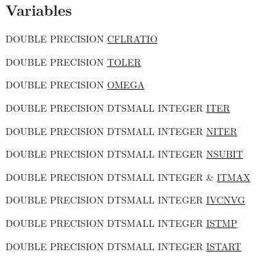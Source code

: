 \subsection*{Variables}
\begin{DoxyCompactItemize}
\item 
D\-O\-U\-B\-L\-E P\-R\-E\-C\-I\-S\-I\-O\-N \hyperlink{msa20_2home_2abonfi_2_c_f_d__codes_2_eul_f_s_83_82_83_2include_2conv_8com_afddb47408d5e35303a408fd28821caa1}{C\-F\-L\-R\-A\-T\-I\-O}
\item 
D\-O\-U\-B\-L\-E P\-R\-E\-C\-I\-S\-I\-O\-N \hyperlink{msa20_2home_2abonfi_2_c_f_d__codes_2_eul_f_s_83_82_83_2include_2conv_8com_a695d875d45bd834620ef52158325ca2a}{T\-O\-L\-E\-R}
\item 
D\-O\-U\-B\-L\-E P\-R\-E\-C\-I\-S\-I\-O\-N \hyperlink{msa20_2home_2abonfi_2_c_f_d__codes_2_eul_f_s_83_82_83_2include_2conv_8com_a27b76f3b783d9cc5fffe85f1e22ecb89}{O\-M\-E\-G\-A}
\item 
D\-O\-U\-B\-L\-E P\-R\-E\-C\-I\-S\-I\-O\-N D\-T\-S\-M\-A\-L\-L I\-N\-T\-E\-G\-E\-R \hyperlink{msa20_2home_2abonfi_2_c_f_d__codes_2_eul_f_s_83_82_83_2include_2conv_8com_a5e8268d7a99a27a3889882b8cb685176}{I\-T\-E\-R}
\item 
D\-O\-U\-B\-L\-E P\-R\-E\-C\-I\-S\-I\-O\-N D\-T\-S\-M\-A\-L\-L I\-N\-T\-E\-G\-E\-R \hyperlink{msa20_2home_2abonfi_2_c_f_d__codes_2_eul_f_s_83_82_83_2include_2conv_8com_a0a434a625bddcbee262d330f471d5b54}{N\-I\-T\-E\-R}
\item 
D\-O\-U\-B\-L\-E P\-R\-E\-C\-I\-S\-I\-O\-N D\-T\-S\-M\-A\-L\-L I\-N\-T\-E\-G\-E\-R \hyperlink{msa20_2home_2abonfi_2_c_f_d__codes_2_eul_f_s_83_82_83_2include_2conv_8com_aceeea16657a8729e23a6145062b0af71}{N\-S\-U\-B\-I\-T}
\item 
D\-O\-U\-B\-L\-E P\-R\-E\-C\-I\-S\-I\-O\-N D\-T\-S\-M\-A\-L\-L I\-N\-T\-E\-G\-E\-R \& \hyperlink{msa20_2home_2abonfi_2_c_f_d__codes_2_eul_f_s_83_82_83_2include_2conv_8com_aed14565252ecc7b0d32f2e1eece0e781}{I\-T\-M\-A\-X}
\item 
D\-O\-U\-B\-L\-E P\-R\-E\-C\-I\-S\-I\-O\-N D\-T\-S\-M\-A\-L\-L I\-N\-T\-E\-G\-E\-R \hyperlink{msa20_2home_2abonfi_2_c_f_d__codes_2_eul_f_s_83_82_83_2include_2conv_8com_acef83c369dada2c28e14e0bbf42054cf}{I\-V\-C\-N\-V\-G}
\item 
D\-O\-U\-B\-L\-E P\-R\-E\-C\-I\-S\-I\-O\-N D\-T\-S\-M\-A\-L\-L I\-N\-T\-E\-G\-E\-R \hyperlink{msa20_2home_2abonfi_2_c_f_d__codes_2_eul_f_s_83_82_83_2include_2conv_8com_a6a9285d211dcd0595d66dcbd00736595}{I\-S\-T\-M\-P}
\item 
D\-O\-U\-B\-L\-E P\-R\-E\-C\-I\-S\-I\-O\-N D\-T\-S\-M\-A\-L\-L I\-N\-T\-E\-G\-E\-R \hyperlink{msa20_2home_2abonfi_2_c_f_d__codes_2_eul_f_s_83_82_83_2include_2conv_8com_a860a2b695f2e90fdf11124cedcd72ef6}{I\-S\-T\-A\-R\-T}

\end{DoxyCompactItemize}
